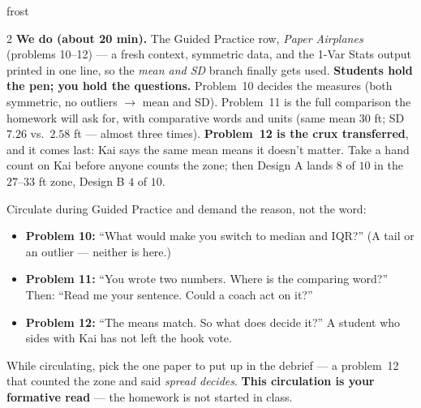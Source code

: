 \documentclass[10pt]{article}
\begin{document}
\begin{skillbox}{frost}
\begin{multicols}{2}
\columnbreak
\textbf{We do (about 20 min).} The Guided Practice row, \emph{Paper Airplanes} (problems
10--12) --- a fresh context, symmetric data, and the 1-Var Stats output printed in one line,
so the \emph{mean and SD} branch finally gets used. \textbf{Students hold the pen; you hold
the questions.} Problem~10 decides the measures (both symmetric, no outliers $\to$ mean and
SD). Problem~11 is the full comparison the homework will ask for, with comparative words and
units (same mean $30$ ft; SD $7.26$ vs.\ $2.58$ ft --- almost three times). \textbf{Problem~12
is the crux transferred}, and it comes last: Kai says the same mean means it doesn't matter.
Take a hand count on Kai before anyone counts the zone; then Design A lands $8$ of $10$ in the
$27$--$33$ ft zone, Design B $4$ of $10$.

Circulate during Guided Practice and demand the reason, not the word:
\begin{itemize}[leftmargin=1.1em, nosep]
  \item \textbf{Problem 10:} ``What would make you switch to median and IQR?'' (A tail or an
        outlier --- neither is here.)
  \item \textbf{Problem 11:} ``You wrote two numbers. Where is the comparing word?'' Then:
        ``Read me your sentence. Could a coach act on it?''
  \item \textbf{Problem 12:} ``The means match. So what does decide it?'' A student who sides
        with Kai has not left the hook vote.
\end{itemize}
While circulating, pick the one paper to put up in the debrief --- a problem~12 that counted
the zone and said \emph{spread decides}. \textbf{This circulation is your formative read} ---
the homework is not started in class.
\end{multicols}
\end{skillbox}
\end{document}
